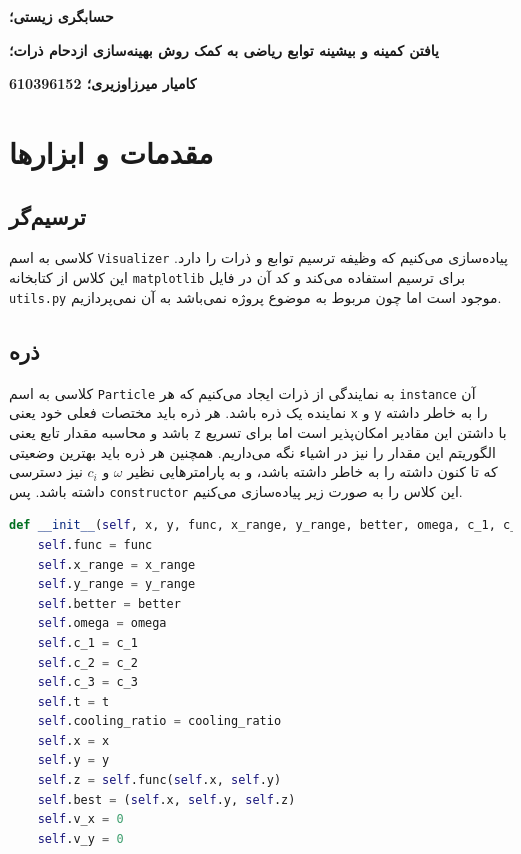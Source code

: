 \documentclass[a4paper, 12pt]{article}
\begin{document}
\textbf{حسابگری زیستی؛}

\textbf{یافتن کمینه و بیشینه توابع ریاضی به کمک روش بهینه‌سازی ازدحام ذرات؛}

\textbf{کامیار میرزاوزیری؛ 610396152}

\hrulefill

\section{مقدمات و ابزارها}

\subsection{ترسیم‌گر}
کلاسی به اسم
\texttt{Visualizer}
پیاده‌سازی می‌کنیم که وظیفه ترسیم توابع و ذرات را دارد. این کلاس از کتابخانه
\texttt{matplotlib}
برای ترسیم استفاده می‌کند و کد آن در فایل
\texttt{utils.py}
موجود است اما چون مربوط به موضوع پروژه نمی‌باشد به آن نمی‌پردازیم.

\subsection{ذره}
کلاسی به اسم
\texttt{Particle}
به نمایندگی از ذرات ایجاد می‌کنیم که هر
\texttt{instance}
آن نماینده یک ذره باشد. هر ذره باید مختصات فعلی خود یعنی
\texttt{x}
و
\texttt{y}
را به خاطر داشته باشد و محاسبه مقدار تابع یعنی
\texttt{z}
با داشتن این مقادیر امکان‌پذیر است اما برای تسریع الگوریتم این مقدار را نیز در اشیاء نگه می‌داریم. همچنین هر ذره باید بهترین وضعیتی که تا کنون داشته را به خاطر داشته باشد، و به پارامترهایی نظیر
$\omega$
و
$c_i$
نیز دسترسی داشته باشد. پس
\texttt{constructor}
این کلاس را به صورت زیر پیاده‌سازی می‌کنیم.

\LTR
\begin{lstlisting}[language=Python]
def __init__(self, x, y, func, x_range, y_range, better, omega, c_1, c_2, c_3, t, cooling_ratio):
    self.func = func
    self.x_range = x_range
    self.y_range = y_range
    self.better = better
    self.omega = omega
    self.c_1 = c_1
    self.c_2 = c_2
    self.c_3 = c_3
    self.t = t
    self.cooling_ratio = cooling_ratio
    self.x = x
    self.y = y
    self.z = self.func(self.x, self.y)
    self.best = (self.x, self.y, self.z)
    self.v_x = 0
    self.v_y = 0
\end{lstlisting}
\RTL
\end{document}
